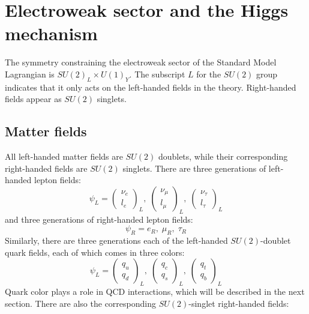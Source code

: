 \section{Electroweak sector and the Higgs mechanism}\label{sec:sm_ew}

The symmetry constraining the electroweak sector of the Standard Model Lagrangian is $SU(2)_L \times U(1)_Y$.
The subscript $L$ for the $SU(2)$ group indicates that it only acts on the left-handed fields in the theory.
Right-handed fields appear as $SU(2)$ singlets.

\subsection{Matter fields}\label{subsec:ew_fields}

All left-handed matter fields are $SU(2)$ doublets, while their corresponding right-handed fields are $SU(2)$ singlets.
There are three generations of left-handed lepton fields:
\begin{equation}\label{eq:left_handed_leptons}
    \psi_L =
    \begin{pmatrix}
        \nu_e \\ l_e
    \end{pmatrix}_L,\;
    \begin{pmatrix}
        \nu_{\mu} \\ l_{\mu}
    \end{pmatrix}_L,\;
     \begin{pmatrix}
        \nu_{\tau} \\ l_{\tau}
    \end{pmatrix}_L
\end{equation}
and three generations of right-handed lepton fields:
\begin{equation}\label{eq:right_handed_leptons}
\psi_R = e_R,\; \mu_R,\; \tau_R
\end{equation}
Similarly, there are three generations each of the left-handed $SU(2)$-doublet quark fields,
each of which comes in three colors:
\begin{equation}\label{eq:left_handed_quarks}
   \psi_L =
    \begin{pmatrix}
        q_u \\ q_d
    \end{pmatrix}_L,\;
    \begin{pmatrix}
        q_{c} \\ q_{s}
    \end{pmatrix}_L,\;
     \begin{pmatrix}
        q_{t} \\ q_{b}
    \end{pmatrix}_L
\end{equation}
Quark color plays a role in QCD interactions, which will be described in the next section.
There are also the corresponding $SU(2)$-singlet right-handed fields:

